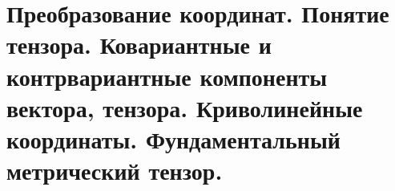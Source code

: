 \chapter{Преобразование координат. Понятие тензора. Ковариантные и
контрвариантные компоненты вектора, тензора. Криволинейные координаты.
Фундаментальный метрический тензор.}

\newpage
